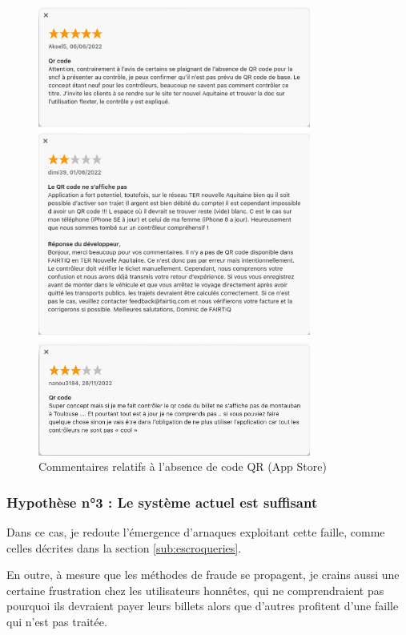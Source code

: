 \documentclass[a4paper]{article}
\begin{document}
\begin{figure}
  \centering
  \includegraphics[width=0.8\textwidth]{illustrations/images/comments/all3.png}
  \caption{Commentaires relatifs à l'absence de code QR (App Store)}
  \label{fig:no_qr_code_comments}
\end{figure}


\clearpage

\subsubsection*{Hypothèse n°3 : Le système actuel est suffisant}
Dans ce cas, je redoute l'émergence d'arnaques exploitant cette faille, comme celles décrites dans la section \ref*{sub:escroqueries}.

En outre, à mesure que les méthodes de fraude se propagent, je crains aussi une certaine frustration chez les utilisateurs
honnêtes, qui ne comprendraient pas pourquoi ils devraient payer leurs billets alors que d'autres profitent d'une faille
qui n'est pas traitée.
\end{document}
